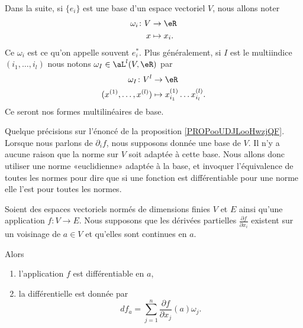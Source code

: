 \begin{normaltext}
    Dans la suite, si \( \{ e_i \}\) est une base d'un espace vectoriel \( V\), nous allons noter
    \begin{equation}
        \begin{aligned}
            \omega_i\colon V&\to \eR \\
            x&\mapsto x_i.
        \end{aligned}
    \end{equation}
    Ce \( \omega_i\) est ce qu'on appelle souvent \( e_i^*\). Plus généralement, si \( I\) est le multiindice \( (i_1,\ldots, i_l)\) nous notons \( \omega_I\in \aL^l(V,\eR)\) par
    \begin{equation}
        \begin{aligned}
            \omega_I\colon V^l&\to \eR \\
            (x^{(1)},\ldots, x^{(l)})&\mapsto  x^{(1)}_{i_1}\ldots x^{(l)}_{i_l}.
        \end{aligned}
    \end{equation}
    Ce seront nos formes multilinéaires de base.
\end{normaltext}

\begin{normaltext}      \label{NORMooDAZZooDiGFoW}
    Quelque précisions sur l'énoncé de la proposition \ref{PROPooUDJLooHwzjQF}. Lorsque nous parlons de \( \partial_if\), nous supposons donnée une base de \( V\). Il n'y a aucune raison que la norme sur \( V\) soit adaptée à cette base. Nous allons donc utiliser une norme «euclidienne» adaptée à la base, et invoquer l'équivalence de toutes les normes pour dire que si une fonction est différentiable pour une norme elle l'est pour toutes les normes.
\end{normaltext}

\begin{proposition}     \label{PROPooUDJLooHwzjQF}
    Soient des espaces vectoriels normés de dimensions finies \( V\) et \( E\) ainsi qu'une application \( f\colon V\to E\). Nous supposons que les dérivées partielles \( \frac{ \partial f }{ \partial x_i }\) existent sur un voisinage de \( a\in V\) et qu'elles sont continues en \( a\).
    
    Alors
    \begin{enumerate}
        \item
            l'application \( f\) est différentiable en \( a\),
        \item
            la différentielle est donnée par
            \begin{equation}
                df_a=\sum_{j=1}^n\frac{ \partial f }{ \partial x_j }(a)\omega_j.
            \end{equation}
    \end{enumerate}
\end{proposition}

